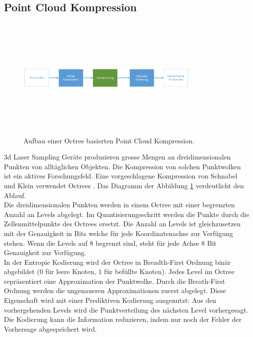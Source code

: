 \subsection{Point Cloud Kompression} \label{state:pointcloud}
\begin{figure}[!htbp]
	\center
	\includegraphics[width=0.8\textwidth,height=6cm,keepaspectratio]{./pictures/state/pointcloud.png}
	\caption{Aufbau einer Octree basierten Point Cloud Kompression.}
	\label{state:pointcloud:abb}
\end{figure}
3d Laser Sampling Geräte produzieren grosse Mengen an dreidimensionalen Punkten von alltäglichen Objekten. Die Kompression von solchen Punktwolken ist ein aktives Forschungsfeld. Eine vorgeschlagene Kompression  von Schnabel und Klein \cite{schnabel2006octree} verwendet Octrees \cite{wiki:octree}. Das Diagramm der Abbildung \ref{state:pointcloud:abb} verdeutlicht den Ablauf.\\
Die dreidimensionalen Punkten werden in einem Octree mit einer begrenzten Anzahl an Levels abgelegt. Im Quantisierungsschritt werden die Punkte durch die Zellenmittelpunkte des Octrees ersetzt. Die Anzahl an Levels ist gleichzusetzen mit der Genauigkeit in Bits welche für jede Koordinatenachse zur Verfügung stehen. Wenn die Levels auf $8$ begrenzt sind, steht für jede Achse $8$ Bit Genauigkeit zur Verfügung.\\
In der Entropie Kodierung wird der Octree in Breadth-First Ordnung binär abgebildet ($0$ für leere Knoten, $1$ für befüllte Knoten). Jedes Level im Octree repräsentiert eine Approximation der Punktwolke. Durch  die Breath-First Ordnung werden die ungenaueren Approximationen zuerst abgelegt. Diese Eigenschaft wird mit einer Prediktiven Kodierung ausgenutzt: Aus den vorhergehenden Levels wird die Punktverteilung des nächsten Level vorhergesagt. Die Kodierung kann die Information reduzieren, indem nur noch der Fehler der Vorhersage abgespeichert wird.

